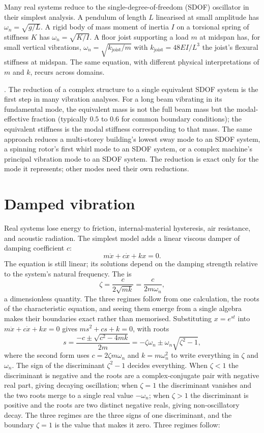 Many real systems reduce to the single-degree-of-freedom (SDOF)
oscillator in their simplest analysis. A pendulum of length $L$
linearised at small amplitude has $\omega_n = \sqrt{g/L}$. A rigid
body of mass moment of inertia $I$ on a torsional spring of
stiffness $K$ has $\omega_n = \sqrt{K/I}$. A floor joist supporting
a load $m$ at midspan has, for small vertical vibrations, $\omega_n
= \sqrt{k_{\text{joist}}/m}$ with $k_{\text{joist}} = 48 EI/L^3$
the joist's flexural stiffness at midspan. The same equation, with
different physical interpretations of $m$ and $k$, recurs across
domains.

. The reduction of
a complex structure to a single equivalent SDOF system is the first
step in many vibration analyses. For a long beam vibrating in its
fundamental mode, the equivalent mass is not the full beam mass but
the modal-effective fraction (typically $0.5$ to $0.6$ for common
boundary conditions); the equivalent stiffness is the modal
stiffness corresponding to that mass. The same approach reduces a
multi-storey building's lowest sway mode to an SDOF system, a
spinning rotor's first whirl mode to an SDOF system, or a complex
machine's principal vibration mode to an SDOF system. The reduction
is exact only for the mode it represents; other modes need their
own reductions.

\section{Damped vibration}

Real systems lose energy to friction, internal-material hysteresis,
air resistance, and acoustic radiation. The simplest model adds a
linear viscous damper of damping coefficient $c$:
\[
m\ddot{x} + c\dot{x} + kx = 0.
\]
The equation is still linear; its solutions depend on the damping
strength relative to the system's natural frequency. The
 is
\[
\zeta = \frac{c}{2\sqrt{mk}} = \frac{c}{2 m \omega_n},
\]
a dimensionless quantity. The three regimes follow from one
calculation, the roots of the characteristic equation, and seeing them
emerge from a single algebra makes their boundaries exact rather than
memorised. Substituting $x = e^{st}$ into $m\ddot{x} + c\dot{x} + kx =
0$ gives $ms^2 + cs + k = 0$, with roots
\[
s = \frac{-c \pm \sqrt{c^2 - 4mk}}{2m} = -\zeta\omega_n \pm \omega_n
\sqrt{\zeta^2 - 1},
\]
where the second form uses $c = 2\zeta m\omega_n$ and $k = m\omega_n^2$
to write everything in $\zeta$ and $\omega_n$. The sign of the
discriminant $\zeta^2 - 1$ decides everything. When $\zeta < 1$ the
discriminant is negative and the roots are a complex-conjugate pair with
negative real part, giving decaying oscillation; when $\zeta = 1$ the
discriminant vanishes and the two roots merge to a single real value
$-\omega_n$; when $\zeta > 1$ the discriminant is positive and the
roots are two distinct negative reals, giving non-oscillatory decay. The
three regimes are the three signs of one discriminant, and the boundary
$\zeta = 1$ is the value that makes it zero. Three regimes follow:

